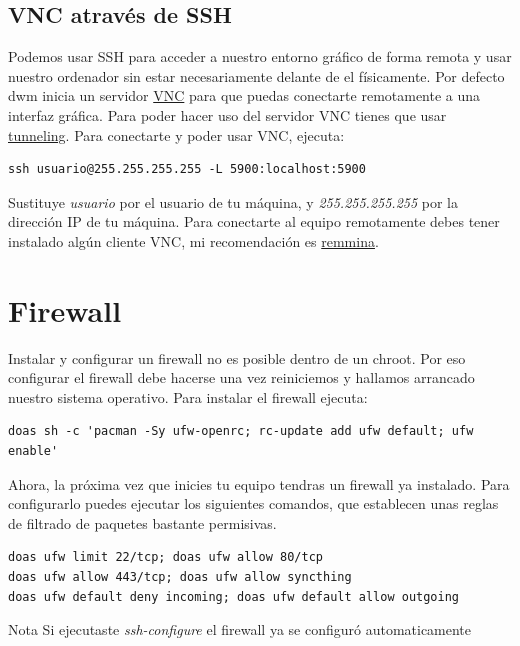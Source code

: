 \documentclass[11pt]{article}
\begin{document}
\subsection{VNC através de SSH}

Podemos usar SSH para acceder a nuestro entorno gráfico de forma remota y usar nuestro ordenador sin estar necesariamente delante de el físicamente. Por defecto dwm inicia un servidor \href{https://en.wikipedia.org/wiki/Virtual_Network_Computing}{VNC} para que puedas conectarte remotamente a una interfaz gráfica. Para poder hacer uso del servidor VNC tienes que usar \href{https://en.wikipedia.org/wiki/Tunneling_protocol}{tunneling}. Para conectarte y poder usar VNC, ejecuta:

\begin{verbatim}
ssh usuario@255.255.255.255 -L 5900:localhost:5900
\end{verbatim}

Sustituye \textit{usuario} por el usuario de tu máquina, y \textit{255.255.255.255} por la dirección IP de tu máquina. Para conectarte al equipo remotamente debes tener instalado algún cliente VNC, mi recomendación es \href{https://github.com/FreeRDP/Remmina}{remmina}.

\section{Firewall}

Instalar y configurar un firewall no es posible dentro de un chroot. Por eso configurar el firewall debe hacerse una vez reiniciemos y hallamos arrancado nuestro sistema operativo. Para instalar el firewall ejecuta:

\begin{verbatim}
doas sh -c 'pacman -Sy ufw-openrc; rc-update add ufw default; ufw enable'
\end{verbatim}

Ahora, la próxima vez que inicies tu equipo tendras un firewall ya instalado. Para configurarlo puedes ejecutar los siguientes comandos, que establecen unas reglas de filtrado de paquetes bastante permisivas.

\begin{verbatim}
doas ufw limit 22/tcp; doas ufw allow 80/tcp
doas ufw allow 443/tcp; doas ufw allow syncthing
doas ufw default deny incoming; doas ufw default allow outgoing
\end{verbatim}

\begin{mybox}{Nota}
Si ejecutaste \textit{ssh-configure} el firewall ya se configuró automaticamente
\end{mybox}
\end{document}
